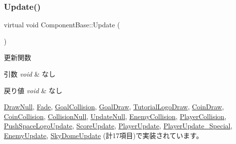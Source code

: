 \mbox{\label{class_component_base_a58e66d65bc8f3cd5ab67b4b2deab4fc2}} 
\subsubsection{\texorpdfstring{Update()}{Update()}}
{\footnotesize\ttfamily virtual void Component\+Base\+::\+Update (\begin{DoxyParamCaption}{ }\end{DoxyParamCaption})\hspace{0.3cm}{\ttfamily [pure virtual]}}



更新関数 


\begin{DoxyParams}{引数}
{\em void} & なし \\
\hline
\end{DoxyParams}

\begin{DoxyRetVals}{戻り値}
{\em void} & なし \\
\hline
\end{DoxyRetVals}


\mbox{\hyperlink{class_draw_null_ad32a508d269de7eda8ad24ea72230464}{Draw\+Null}}, \mbox{\hyperlink{class_fade_a1579b5b9020344a1131ea11c15f2c0bd}{Fade}}, \mbox{\hyperlink{class_goal_collision_a1e3995dc2f5ba2678580d06699ca6936}{Goal\+Collision}}, \mbox{\hyperlink{class_goal_draw_a6e003277ed44eb9c800a616b6acbcb20}{Goal\+Draw}}, \mbox{\hyperlink{class_tutorial_logo_draw_af69405fcc8b20684a19e982726d93ffa}{Tutorial\+Logo\+Draw}}, \mbox{\hyperlink{class_coin_draw_a6157b17bf1706b85156aad0d88acfd7e}{Coin\+Draw}}, \mbox{\hyperlink{class_coin_collision_a981fd9b1b8c688a757a456a56d80501b}{Coin\+Collision}}, \mbox{\hyperlink{class_collision_null_ad6ac0e9b06fcb4e3d19a5c3c1cadfe7e}{Collision\+Null}}, \mbox{\hyperlink{class_update_null_ab3f9cabc6ddcb4ef8743f212c26be144}{Update\+Null}}, \mbox{\hyperlink{class_enemy_collision_ab54133504d867c6d2070d2f3854a0aaf}{Enemy\+Collision}}, \mbox{\hyperlink{class_player_collision_a09f97f220903f5724a3af6b97af3a336}{Player\+Collision}}, \mbox{\hyperlink{class_push_space_logo_update_aa07fe6f6f4f072e1f81bc6708dd4727e}{Push\+Space\+Logo\+Update}}, \mbox{\hyperlink{class_score_update_aae2b398784079a651ed92eb4c634b1c9}{Score\+Update}}, \mbox{\hyperlink{class_player_update_af6e1b8ca60399f232e64d2acb4968c75}{Player\+Update}}, \mbox{\hyperlink{class_player_update___special_afef3503e292dbaded809068fd87deadd}{Player\+Update\+\_\+\+Special}}, \mbox{\hyperlink{class_enemy_update_ae9662f3a2d064dc69c0d68293e60f051}{Enemy\+Update}}, \mbox{\hyperlink{class_sky_dome_update_ae163cb90e4de561fe1f7b2cb311be331}{Sky\+Dome\+Update}} (計17項目)で実装されています。



